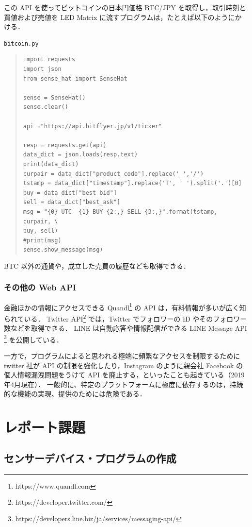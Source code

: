 \documentclass[11pt,a4,epsf]{report}
\begin{document}
この API を使ってビットコインの日本円価格 BTC/JPY を取得し，取引時刻と買値および売値を LED Matrix に流すプログラムは，たとえば以下のようにかける．
\begin{itembox}[l]{\tt bitcoin.py}
\begin{quote}
\small
\begin{verbatim}
import requests
import json
from sense_hat import SenseHat

sense = SenseHat()
sense.clear()
 
api ="https://api.bitflyer.jp/v1/ticker"
 
resp = requests.get(api)
data_dict = json.loads(resp.text) 
print(data_dict)
curpair = data_dict["product_code"].replace('_','/')
tstamp = data_dict["timestamp"].replace('T', ' ').split('.')[0]
buy = data_dict["best_bid"]
sell = data_dict["best_ask"]
msg = "{0} UTC  {1} BUY {2:,} SELL {3:,}".format(tstamp, curpair, \
buy, sell)
#print(msg)
sense.show_message(msg)
\end{verbatim}
\end{quote}
\end{itembox}
BTC 以外の通貨や，成立した売買の履歴なども取得できる．

\subsection{その他の Web API}

金融ほかの情報にアクセスできる Quandl\footnote{\sf https://www.quandl.com} の API は，有料情報が多いが広く知られている．
Twitter API\footnote{\sf https://developer.twitter.com/} では，Twitter でフォロワーの ID やそのフォロワー数などを取得できる．
LINE は自動応答や情報配信ができる LINE Message API \footnote{\sf https://developers.line.biz/ja/services/messaging-api/} を公開している．

一方で，プログラムによると思われる極端に頻繁なアクセスを制限するために twitter 社が API の制限を強化したり，Instagram のように親会社 Facebook の個人情報漏洩問題をうけて API を廃止する，といったことも起きている（2019年4月現在）．
一般的に、特定のプラットフォームに極度に依存するのは，持続的な機能の実現、提供のためには危険である．


\chapter{レポート課題}

\section{センサーデバイス・プログラムの作成}
\end{document}
